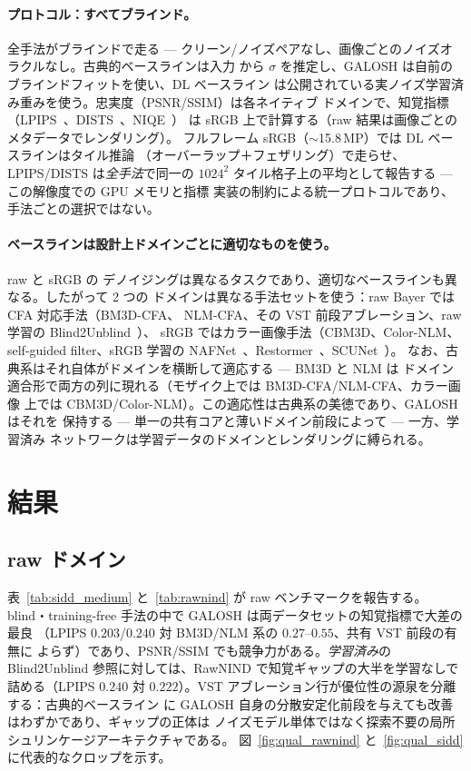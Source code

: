\documentclass[10pt,twocolumn]{article}
\begin{document}
\paragraph{プロトコル：すべてブラインド。} 全手法がブラインドで走る ---
クリーン/ノイズペアなし、画像ごとのノイズオラクルなし。古典的ベースラインは入力
から $\sigma$ を推定し、GALOSH は自前のブラインドフィットを使い、DL ベースライン
は公開されている実ノイズ学習済み重みを使う。忠実度（PSNR/SSIM）は各ネイティブ
ドメインで、知覚指標（LPIPS~\cite{lpips}、DISTS~\cite{dists}、NIQE~\cite{niqe}）
は sRGB 上で計算する（raw 結果は画像ごとのメタデータでレンダリング）。
フルフレーム sRGB（$\sim$15.8\,MP）では DL ベースラインはタイル推論
（オーバーラップ＋フェザリング）で走らせ、LPIPS/DISTS は\emph{全手法}で同一の
$1024^2$ タイル格子上の平均として報告する --- この解像度での GPU メモリと指標
実装の制約による統一プロトコルであり、手法ごとの選択ではない。

\paragraph{ベースラインは設計上ドメインごとに適切なものを使う。} raw と sRGB の
デノイジングは異なるタスクであり、適切なベースラインも異なる。したがって 2 つの
ドメインは異なる手法セットを使う：raw Bayer では CFA 対応手法（BM3D-CFA、
NLM-CFA、その VST 前段アブレーション、raw 学習の Blind2Unblind~\cite{b2u}）、
sRGB ではカラー画像手法（CBM3D、Color-NLM、self-guided filter、sRGB 学習の
NAFNet~\cite{nafnet}、Restormer~\cite{restormer}、SCUNet~\cite{scunet}）。
なお、古典系はそれ自体がドメインを横断して適応する --- BM3D と NLM は
ドメイン適合形で両方の列に現れる（モザイク上では BM3D-CFA/NLM-CFA、カラー画像
上では CBM3D/Color-NLM）。この適応性は古典系の美徳であり、GALOSH はそれを
保持する --- 単一の共有コアと薄いドメイン前段によって --- 一方、学習済み
ネットワークは学習データのドメインとレンダリングに縛られる。

\section{結果}\label{sec:results}

\subsection{raw ドメイン}\label{sec:rawres}
表~\ref{tab:sidd_medium} と~\ref{tab:rawnind} が raw ベンチマークを報告する。
blind・training-free 手法の中で GALOSH は両データセットの知覚指標で大差の最良
（LPIPS $0.203$/$0.240$ 対 BM3D/NLM 系の $0.27$--$0.55$、共有 VST 前段の有無に
よらず）であり、PSNR/SSIM でも競争力がある。\emph{学習済み}の Blind2Unblind
参照に対しては、RawNIND で知覚ギャップの大半を学習なしで詰める（LPIPS $0.240$
対 $0.222$）。VST アブレーション行が優位性の源泉を分離する：古典的ベースライン
に GALOSH 自身の分散安定化前段を与えても改善はわずかであり、ギャップの正体は
ノイズモデル単体ではなく探索不要の局所シュリンケージアーキテクチャである。
図~\ref{fig:qual_rawnind} と~\ref{fig:qual_sidd} に代表的なクロップを示す。
\end{document}
